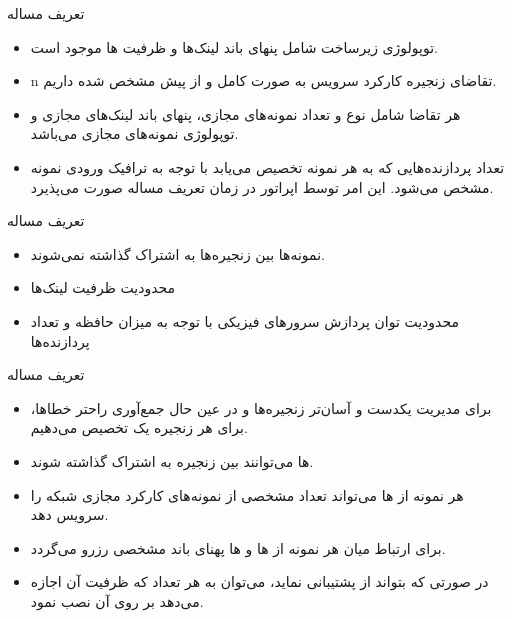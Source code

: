 \documentclass{beamer}
\makeatletter
\newcommand{\RTList}{\raggedleft\rightskip\@totalleftmargin}
\makeatother
\begin{document}
\begin{persian}
\begin{frame}{تعریف مساله} %
    \begin{itemize}\RTList{}
        \item توپولوژی زیرساخت شامل پنهای باند لینک‌ها و ظرفیت ها موجود است.
        \item n تقاضای زنجیره‌ کارکرد سرویس به صورت کامل و از پیش مشخص شده داریم.
        \item هر تقاضا شامل نوع و تعداد نمونه‌های مجازی، پنهای باند لینک‌های مجازی و توپولوژی
        نمونه‌های مجازی می‌باشد.
        \item تعداد پردازنده‌هایی که به هر نمونه تخصیص می‌یابد با توجه به ترافیک ورودی نمونه مشخص می‌شود.
        این امر توسط اپراتور در زمان تعریف مساله صورت می‌پذیرد.
    \end{itemize}
\end{frame}
\begin{frame}{تعریف مساله} %
    \begin{itemize}\RTList{}
        \item نمونه‌ها بین زنجیره‌ها به اشتراک گذاشته نمی‌شوند.
        \item محدودیت ظرفیت لینک‌ها
        \item محدودیت توان پردازش سرورهای فیزیکی با توجه به میزان حافظه و تعداد پردازنده‌ها
    \end{itemize}
\end{frame}
\begin{frame}{تعریف مساله} %
    \begin{itemize}\RTList{}
        \item برای مدیریت یکدست و آسان‌تر زنجیره‌ها و در عین حال جمع‌آوری راحتر خطاها، برای هر زنجیره یک  تخصیص می‌دهیم.
        \item {}ها می‌توانند بین زنجیره به اشتراک گذاشته شوند.
        \item هر نمونه از ها می‌تواند تعداد مشخصی از نمونه‌های کارکرد مجازی شبکه را سرویس دهد. 
        \item برای ارتباط میان هر نمونه از ها و ها پهنای باند مشخصی رزرو می‌گردد.
        \item در صورتی که  بتواند از  پشتیبانی نماید،
        می‌توان به هر تعداد که ظرفیت آن اجازه می‌دهد بر روی آن  نصب نمود.
    \end{itemize}
\end{frame}

\end{persian}
\end{document}
